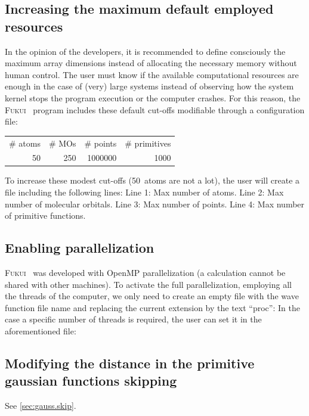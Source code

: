 \documentclass[a4paper,11pt,openany]{memoir}
\newcommand\programa{\textsc{Fukui}}
\begin{document}
\subsection{Increasing the maximum default employed resources}\label{subsec:resources}
In the opinion of the developers, it is recommended to define consciously the maximum array dimensions instead of allocating the necessary memory without human control. The user must know if the available computational resources are enough in the case of (very) large systems instead of observing how the system kernel stops the program execution or the computer crashes. For this reason, the \programa~ program includes these default cut-offs modifiable through a configuration file:
\begin{center}
	\begin{tabular}{rrrr}
			\toprule
				{\# atoms}	&	{\# MOs}	&	{\# points}	&	{\# primitives}	\\
				50			&	250		&	1000000		&	1000			\\
			\bottomrule
		\end{tabular}
\end{center}

To increase these modest cut-offs (\SI{50}{atoms} are not a lot), the user will create a file including the following lines:
Line 1: Max number of atoms.
Line 2: Max number of molecular orbitals.
Line 3: Max number of points.
Line 4: Max number of primitive functions.

\subsection{Enabling parallelization}
\programa~ was developed with OpenMP parallelization (a calculation cannot be shared with other machines). To activate the full parallelization, employing all the threads of the computer, we only need to create an empty file with the wave function file name and replacing the current extension by the text ``proc'':
In the case a specific number of threads is required, the user can set it in the aforementioned file:

\subsection{Modifying the distance in the primitive gaussian functions skipping}
See \autoref{sec:gauss.skip}.
\end{document}
